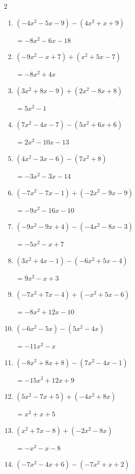 \begin{multicols}{2}
\begin{enumerate}
        $=3x^{2}+5x+13$

  \item $(-4x^{2}-5x-9)-(4x^{2}+x+9)$

        $=-8x^{2}-6x-18$

  \item $(-9x^{2}-x+7)+(x^{2}+5x-7)$

        $=-8x^{2}+4x$

  \item $(3x^{2}+8x-9)+(2x^{2}-8x+8)$

        $=5x^{2}-1$

  \item $(7x^{2}-4x-7)-(5x^{2}+6x+6)$

        $=2x^{2}-10x-13$

  \item $(4x^{2}-3x-6)-(7x^{2}+8)$

        $=-3x^{2}-3x-14$

  \item $(-7x^{2}-7x-1)+(-2x^{2}-9x-9)$

        $=-9x^{2}-16x-10$

  \item $(-9x^{2}-9x+4)-(-4x^{2}-8x-3)$

        $=-5x^{2}-x+7$

  \item $(3x^{2}+4x-1)-(-6x^{2}+5x-4)$

        $=9x^{2}-x+3$

  \item $(-7x^{2}+7x-4)+(-x^{2}+5x-6)$

        $=-8x^{2}+12x-10$

  \item $(-6x^{2}-5x)-(5x^{2}-4x)$

        $=-11x^{2}-x$

\columnbreak %

\resetques

  \item $(-8x^{2}+8x+8)-(7x^{2}-4x-1)$

        $=-15x^{2}+12x+9$

  \item $(5x^{2}-7x+5)+(-4x^{2}+8x)$

        $=x^{2}+x+5$

  \item $(x^{2}+7x-8)+(-2x^{2}-8x)$

        $=-x^{2}-x-8$

  \item $(-7x^{2}-4x+6)-(-7x^{2}+x+2)$


\end{enumerate}
\end{multicols}
